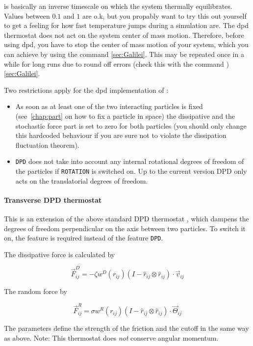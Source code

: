 is basically an inverse timescale on which the system
thermally equilibrates.  Values between $0.1$ and $1$ are o.k, but you
propably want to try this out yourself to get a feeling for how fast
temperature jumps during a simulation are. The dpd thermostat does not
act on the system center of mass motion.  Therefore, before using dpd,
you have to stop the center of mass motion of your system, which you
can achieve by using the command  
\ref{sec:Galilei}. This may be repeated once in a while for long 
runs due to round off errors (check this with the command 
) \ref{sec:Galilei}.

Two restrictions apply for the dpd implementation of \es:

\begin{itemize}
\item As soon as at least one of the two interacting particles is
  fixed (see~\ref{chap:part} on how to fix a particle in space) the
  dissipative and the stochastic force part is set to zero for both
  particles (you should only change this hardcoded behaviour if you
  are sure not to violate the dissipation fluctuation theorem).
\item \texttt{DPD} does not take into account any internal rotational
  degrees of freedom of the particles if \texttt{ROTATION} is switched
  on. Up to the current version DPD only acts on the translatorial
  degrees of freedom.
\end{itemize}

\paragraph{Transverse DPD thermostat}\label{sec:transDPD}
This is an extension of the above standard DPD thermostat
\cite{junghans2008}, which dampens the degrees of freedom
perpendicular on the axis between two particles. To switch it on, the
feature  is required instead of the feature
\texttt{DPD}.

The dissipative force is calculated by

$$ \vec{F}_{ij}^{D} = -\zeta w^D (r_{ij}) (I-\hat{r}_{ij}\otimes\hat{r}_{ij}) \cdot \vec{v}_{ij}$$

The random force by

$$ \vec{F}_{ij}^R = \sigma w^R (r_{ij}) (I-\hat{r}_{ij}\otimes\hat{r}_{ij}) \cdot \vec{\Theta}_{ij}$$

The parameters   define the strength of the
friction and the cutoff in the same way as above.  Note: This
thermostat does \emph{not} conserve angular momentum.

